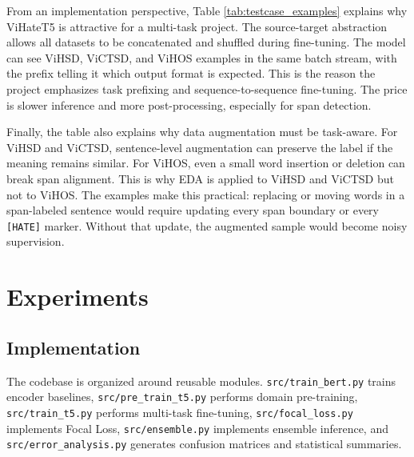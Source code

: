 \documentclass[journal]{IEEEtran}
\begin{document}
From an implementation perspective, Table \ref{tab:testcase_examples} explains why ViHateT5 is attractive for a multi-task project. The source-target abstraction allows all datasets to be concatenated and shuffled during fine-tuning. The model can see ViHSD, ViCTSD, and ViHOS examples in the same batch stream, with the prefix telling it which output format is expected. This is the reason the project emphasizes task prefixing and sequence-to-sequence fine-tuning. The price is slower inference and more post-processing, especially for span detection.

Finally, the table also explains why data augmentation must be task-aware. For ViHSD and ViCTSD, sentence-level augmentation can preserve the label if the meaning remains similar. For ViHOS, even a small word insertion or deletion can break span alignment. This is why EDA is applied to ViHSD and ViCTSD but not to ViHOS. The examples make this practical: replacing or moving words in a span-labeled sentence would require updating every span boundary or every \texttt{[HATE]} marker. Without that update, the augmented sample would become noisy supervision.

\section{Experiments}
\subsection{Implementation}
The codebase is organized around reusable modules. \texttt{src/train\_bert.py} trains encoder baselines, \texttt{src/pre\_train\_t5.py} performs domain pre-training, \texttt{src/train\_t5.py} performs multi-task fine-tuning, \texttt{src/focal\_loss.py} implements Focal Loss, \texttt{src/ensemble.py} implements ensemble inference, and \texttt{src/error\_analysis.py} generates confusion matrices and statistical summaries.

\begin{table}[!t]
\centering
\caption{Training configurations used in the reimplementation.}
\label{tab:config}
\end{table}
\end{document}
